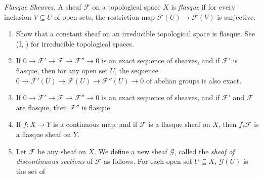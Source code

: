 {\begin{description}[leftmargin=2.4em,labelindent=0pt,topsep=3pt,itemsep=5pt,parsep=0pt]
\item[\hypertarget{ex-II-1.16}{}\textbf{1.16.}] \emph{Flasque Sheaves.} A sheaf $\mathcal F$ on a topological space $X$ is \emph{flasque} if for every inclusion $V\subseteq U$ of open sets, the restriction map $\mathcal F(U)\to\mathcal F(V)$ is surjective.
\begin{enumerate}[label=(\alph*),leftmargin=1.55em,nosep]
\item\hypertarget{ex-II-1.16a}{} Show that a constant sheaf on an irreducible topological space is flasque. See (I, ) for irreducible topological spaces.
\item\hypertarget{ex-II-1.16b}{} If $0\to\mathcal F'\to\mathcal F\to\mathcal F''\to0$ is an exact sequence of sheaves, and if $\mathcal F'$ is flasque, then for any open set $U$, the sequence $0\to\mathcal F'(U)\to\mathcal F(U)\to\mathcal F''(U)\to0$ of abelian groups is also exact.
\item\hypertarget{ex-II-1.16c}{} If $0\to\mathcal F'\to\mathcal F\to\mathcal F''\to0$ is an exact sequence of sheaves, and if $\mathcal F'$ and $\mathcal F$ are flasque, then $\mathcal F''$ is flasque.
\item If $f\colon X\to Y$ is a continuous map, and if $\mathcal F$ is a flasque sheaf on $X$, then $f_*\mathcal F$ is a flasque sheaf on $Y$.
\item\hypertarget{ex-II-1.16e}{} Let $\mathcal F$ be any sheaf on $X$. We define a new sheaf $\mathcal G$, called the \emph{sheaf of discontinuous sections} of $\mathcal F$ as follows. For each open set $U\subseteq X$, $\mathcal G(U)$ is the set of
\end{enumerate}
\end{description}
}
